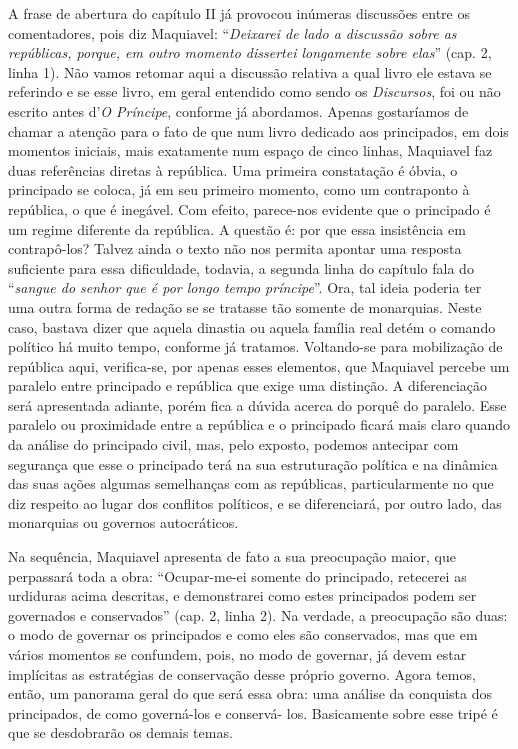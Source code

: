 A frase de abertura do capítulo II já provocou inúmeras discussões entre
os comentadores, pois diz Maquiavel: ``\emph{Deixarei de lado a
discussão sobre as repúblicas, porque, em outro momento dissertei
longamente sobre elas}'' (cap. 2, linha 1). Não vamos retomar aqui a
discussão relativa a qual livro ele estava se referindo e se esse livro,
em geral entendido como sendo os \emph{Discursos}, foi ou não escrito
antes d'\emph{O Príncipe}, conforme já abordamos. Apenas gostaríamos de
chamar a atenção para o fato de que num livro dedicado aos principados,
em dois momentos iniciais, mais exatamente num espaço de cinco linhas,
Maquiavel faz duas referências diretas à república. Uma primeira
constatação é óbvia, o principado se coloca, já em seu primeiro momento,
como um contraponto à república, o que é inegável. Com efeito,
parece-nos evidente que o principado é um regime diferente da república.
A questão é: por que essa insistência em contrapô-los? Talvez ainda o
texto não nos permita apontar uma resposta suficiente para essa
dificuldade, todavia, a segunda linha do capítulo fala do ``\emph{sangue
do senhor que é por longo tempo príncipe}''. Ora, tal ideia poderia ter
uma outra forma de redação se se tratasse tão somente de monarquias.
Neste caso, bastava dizer que aquela dinastia ou aquela família real
detém o comando político há muito tempo, conforme já tratamos.
Voltando-se para mobilização de república aqui, verifica-se, por apenas
esses elementos, que Maquiavel percebe um paralelo entre principado e
república que exige uma distinção. A diferenciação será apresentada
adiante, porém fica a dúvida acerca do porquê do paralelo. Esse paralelo
ou proximidade entre a república e o principado ficará mais claro quando
da análise do principado civil, mas, pelo exposto, podemos antecipar com
segurança que esse o principado terá na sua estruturação política e na
dinâmica das suas ações algumas semelhanças com as repúblicas,
particularmente no que diz respeito ao lugar dos conflitos políticos, e
se diferenciará, por outro lado, das monarquias ou governos
autocráticos.

Na sequência, Maquiavel apresenta de fato a sua preocupação maior, que
perpassará toda a obra: ``Ocupar-me-ei somente do principado, retecerei
as urdiduras acima descritas, e demonstrarei como estes principados
podem ser governados e conservados'' (cap. 2, linha 2). Na verdade, a
preocupação são duas: o modo de governar os principados e como eles são
conservados, mas que em vários momentos se confundem, pois, no modo de
governar, já devem estar implícitas as estratégias de conservação desse
próprio governo. Agora temos, então, um panorama geral do que será essa
obra: uma análise da conquista dos principados, de como governá-los e
conservá- los. Basicamente sobre esse tripé é que se desdobrarão os
demais temas.


